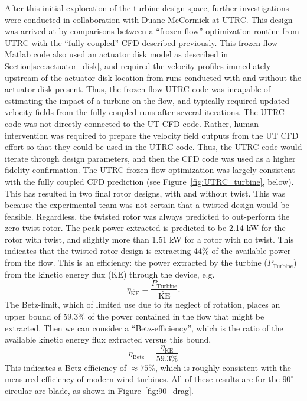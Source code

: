 After this initial exploration of the turbine design space, further
investigations were conducted in collaboration with Duane McCormick at
UTRC. This design was arrived at by comparisons between a ``frozen
flow'' optimization routine from UTRC  with the ``fully coupled'' CFD
described previously. This frozen 
flow Matlab code also used an actuator disk model as described in 
Section\ref{sec:actuator_disk}, and required the velocity profiles
immediately upstream of the actuator disk location from runs conducted
with and without the actuator disk present. Thus, the frozen flow
UTRC code was incapable of estimating the impact of a turbine on the
flow, and typically required updated velocity fields from the fully
coupled runs after several iterations. 
The UTRC code was not directly connected to the UT CFD code. Rather,
human intervention was required to prepare the velocity field outputs
from the UT CFD effort so that they could be used in the UTRC
code. Thus, the UTRC code would iterate through design parameters, and
then the CFD code was used as a higher fidelity confirmation. The UTRC
frozen flow optimization was largely consistent with the fully coupled
CFD prediction (see  Figure~\ref{fig:UTRC_turbine}, below). This has
resulted in two final rotor designs, with and without twist. This was
because the experimental team was not certain that a twisted design
would be feasible. Regardless, the twisted rotor was always predicted to 
out-perform the zero-twist rotor.  
The peak power extracted is predicted to be 2.14 kW for the rotor
with twist, and slightly more than 1.51 kW for a rotor with no twist. 
This indicates that the twisted rotor design is extracting 44\% of the
available power from the flow. This is an efficiency: the power
extracted by the turbine ($P_{\text{Turbine}}$) from the kinetic energy
flux ($\dot{\text{KE}}$) through the device, e.g.
\begin{equation}
\eta_{\dot{\text{KE}}} = \frac{P_{\text{Turbine}}}{\dot{\text{KE}}}. 
\end{equation}
The Betz-limit, which of limited use due to its
neglect of rotation, places an upper bound of 59.3\% of the
power contained in the flow that might be extracted. Then we can
consider a ``Betz-efficiency'', which is the ratio of the available
kinetic energy flux extracted versus this bound, 
\begin{equation}
 \eta_\text{Betz} = \frac{\eta_{\dot{\text{KE}}}}{59.3 \%}
\end{equation}
This indicates a Betz-efficiency of $\approx 75\%$, which is roughly
consistent with the measured efficiency of modern wind turbines. 
All of these results are for the $90^{\circ}$ circular-arc
blade, as shown in Figure~\ref{fig:90_drag}. 

